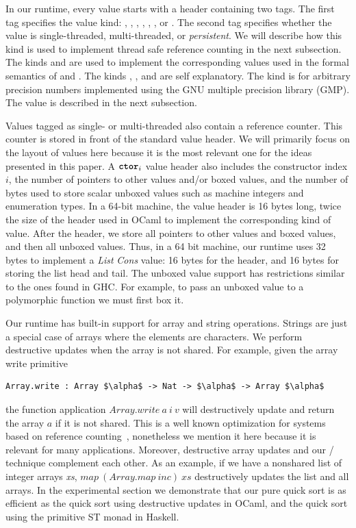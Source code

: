 In our runtime, every value starts with a header containing two
tags. The first tag specifies the value kind: , ,
, , , , or . The
second tag specifies whether the value is single-threaded,
multi-threaded, or \emph{persistent}. We will describe how this kind is used to
implement thread safe reference counting in the next subsection. The kinds  and
 are used to implement the corresponding values used in the
formal semantics of \pureIR{} and \rcIR{}.
The kinds , , and  are self
explanatory.  The kind  is for arbitrary precision numbers
implemented using the GNU multiple precision library (GMP).
The  value is described in the next subsection.

Values tagged as single- or multi-threaded also contain a reference
counter. This counter is stored in front of the standard value header.
We will primarily focus on the layout of  values here because  it is the most
relevant one for the ideas presented in this paper. A $\texttt{\textbf{ctor}}_i$
value header also includes the constructor index $i$, the number of
pointers to other values and/or boxed values, and the number of bytes used to store scalar
unboxed values such as machine integers and enumeration types. In a
64-bit machine, the  value header is 16 bytes long, twice the
size of the header used in OCaml to implement the corresponding kind
of value.  After the header, we store all pointers to other values
and boxed values, and then all unboxed values. Thus, in a 64 bit machine,
our runtime uses 32 bytes to implement a \emph{List} \emph{Cons} value:
16 bytes for the header, and 16 bytes for storing the list head and tail.
The unboxed value support has restrictions similar to the ones found in GHC.
For example, to pass an unboxed value to a polymorphic function we must first box it.

Our runtime has built-in support for array and string operations.
Strings are just a special case of arrays where the elements are
characters. We perform destructive updates when the array is not shared.
For example, given the array write primitive
\begin{lstlisting}
Array.write : Array $\alpha$ -> Nat -> $\alpha$ -> Array $\alpha$
\end{lstlisting}
the function application $\textit{Array.write}\ a\ i\ v$ will
destructively update and return the array $a$ if it is not shared.
This is a well known optimization for systems based on
reference counting~\cite{GCbook}, nonetheless we mention it here
because it is relevant for many applications. Moreover,
destructive array updates and our / technique
complement each other. As an example, if we have a nonshared list of
integer arrays \textit{xs},
$\textit{map}\ (\textit{Array.map}\ \textit{inc})\ \textit{xs}$
destructively updates the list and all arrays. In the experimental
section we demonstrate that our pure quick sort is as efficient as the
quick sort using destructive updates in OCaml, and the quick sort
using the primitive ST monad in Haskell.

